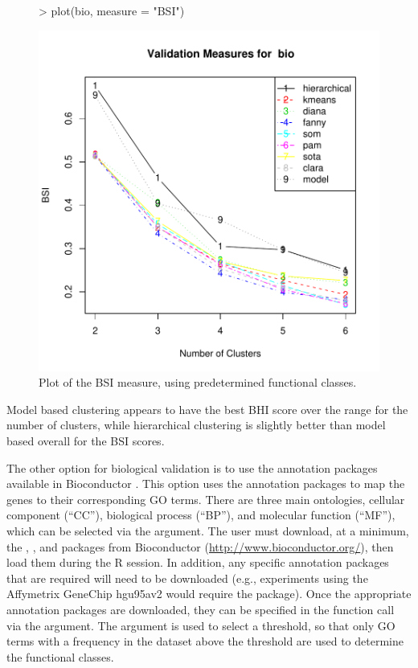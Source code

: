 \documentclass[11pt]{article}
\begin{document}
\begin{figure}
  \centering
\begin{Schunk}
\begin{Sinput}
> plot(bio, measure = "BSI")
\end{Sinput}
\end{Schunk}
\includegraphics{clValid-016}
  \caption{Plot of the BSI measure, using predetermined functional classes.}
  \label{fig:BSI}
\end{figure}


Model based clustering appears to have the best BHI score over the
range for the number of clusters, while hierarchical clustering is
slightly better than model based overall for the BSI scores.

The other option for biological validation is to use the annotation packages available in
Bioconductor \citep{BioC}.  This option uses the annotation packages
to map the genes to their corresponding GO terms.  There
are three main ontologies, cellular component (``CC''), biological process
(``BP''), and molecular function (``MF''), which can be selected via
the  argument.
The user must download, at a
minimum, the , , and  packages from
Bioconductor
(\href{http://www.bioconductor.org/}{http://www.bioconductor.org/}),
then load them during the R session.
In addition, any specific annotation packages that are required will need to be downloaded (e.g.,
experiments using the Affymetrix GeneChip hgu95av2 would require the
 package).  
Once the appropriate annotation packages are downloaded, they can be
specified in the function call via the  argument.
The  argument is used to select a threshold, so that
only GO terms with a frequency in the dataset above the threshold are
used to determine the functional classes.  
\end{document}
